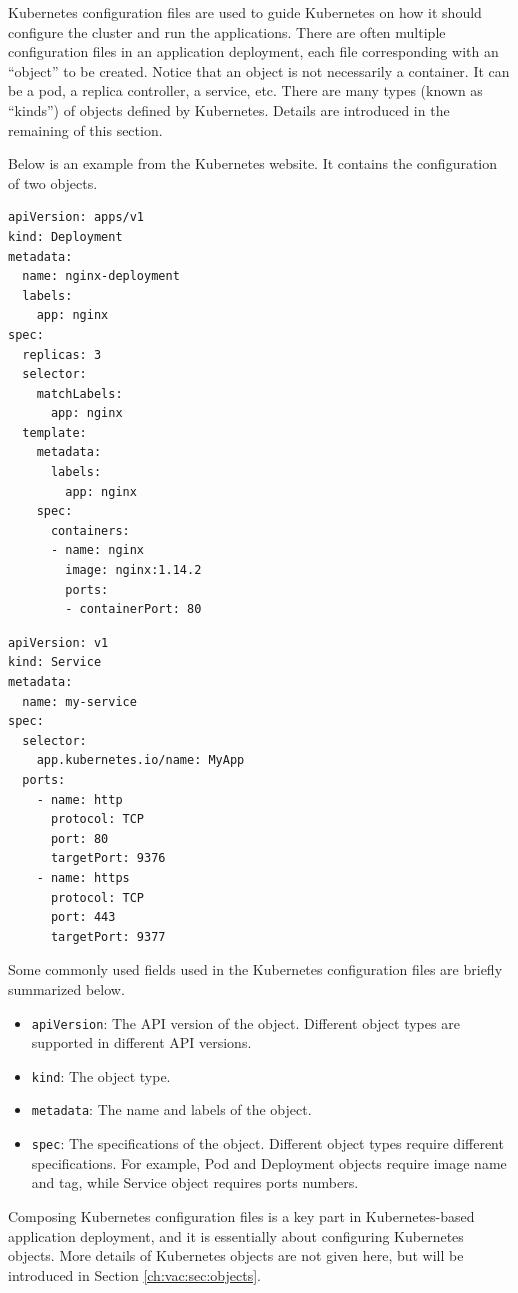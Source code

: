 Kubernetes configuration files are used to guide Kubernetes on how it should configure the cluster and run the applications. There are often multiple configuration files in an application deployment, each file corresponding with an ``object'' to be created. Notice that an object is not necessarily a container. It can be a pod, a replica controller, a service, etc. There are many types (known as ``kinds'') of objects defined by Kubernetes. Details are introduced in the remaining of this section.

Below is an example from the Kubernetes website. It contains the configuration of two objects.
\begin{lstlisting}
apiVersion: apps/v1
kind: Deployment
metadata:
  name: nginx-deployment
  labels:
    app: nginx
spec:
  replicas: 3
  selector:
    matchLabels:
      app: nginx
  template:
    metadata:
      labels:
        app: nginx
    spec:
      containers:
      - name: nginx
        image: nginx:1.14.2
        ports:
        - containerPort: 80
\end{lstlisting}

\begin{lstlisting}
apiVersion: v1
kind: Service
metadata:
  name: my-service
spec:
  selector:
    app.kubernetes.io/name: MyApp
  ports:
    - name: http
      protocol: TCP
      port: 80
      targetPort: 9376
    - name: https
      protocol: TCP
      port: 443
      targetPort: 9377
\end{lstlisting}

Some commonly used fields used in the Kubernetes configuration files are briefly summarized below.
\begin{itemize}
	\item \verb|apiVersion|: The API version of the object. Different object types are supported in different API versions.
	\item \verb|kind|: The object type.
	\item \verb|metadata|: The name and labels of the object. 
	\item \verb|spec|: The specifications of the object. Different object types require different specifications. For example, Pod and Deployment objects require image name and tag, while Service object requires ports numbers. 
\end{itemize}

Composing Kubernetes configuration files is a key part in Kubernetes-based application deployment, and it is essentially about configuring Kubernetes objects. More details of Kubernetes objects are not given here, but will be introduced in Section \ref{ch:vac:sec:objects}.

